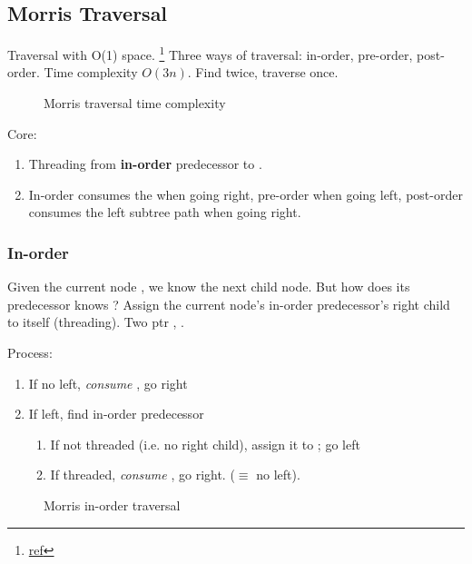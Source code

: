 \subsection{Morris Traversal} 
Traversal with O(1) space. \footnote{\href{http://www.cnblogs.com/AnnieKim/archive/2013/06/15/MorrisTraversal.html}{ref}}
Three ways of traversal: in-order, pre-order, post-order.
Time complexity $O(3n).$ Find  twice, traverse  once.
\begin{figure}[hbtp]
\centering
{}
\caption{Morris traversal time complexity}
\label{fig:morrisTime}
\end{figure}

Core:
\begin{enumerate}
\item Threading from \textbf{in-order} predecessor to .
\item In-order consumes the  when going right, pre-order when going left, post-order consumes the left subtree path when going right. 
\end{enumerate}
\subsubsection{In-order}
Given the current node , we know the next child node. But how does its predecessor knows ? Assign the current node's in-order predecessor's right child to itself (threading). Two ptr , . 

Process:
\begin{enumerate}
\item If no left, \textit{consume} , go right 
\item If left, find in-order predecessor 
\begin{enumerate}
\item If not threaded (i.e. no  right child), assign it to ; go left
\item If threaded, \textit{consume} , go right. ($\equiv$ no left). 
\end{enumerate}
\end{enumerate}

\begin{figure*}[!htb]
\centering
{}
\caption{Morris in-order traversal}
\label{fig:morrisInorder}
\end{figure*}

